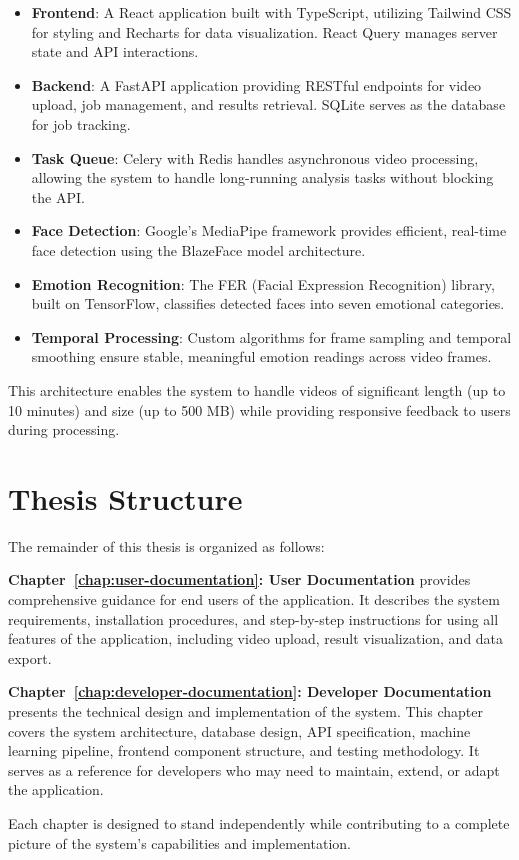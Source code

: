 \begin{itemize}
    \item \textbf{Frontend}: A React application built with TypeScript, utilizing Tailwind CSS for styling and Recharts for data visualization. React Query manages server state and API interactions.

    \item \textbf{Backend}: A FastAPI application providing RESTful endpoints for video upload, job management, and results retrieval. SQLite serves as the database for job tracking.

    \item \textbf{Task Queue}: Celery with Redis handles asynchronous video processing, allowing the system to handle long-running analysis tasks without blocking the API.

    \item \textbf{Face Detection}: Google's MediaPipe framework provides efficient, real-time face detection using the BlazeFace model architecture.

    \item \textbf{Emotion Recognition}: The FER (Facial Expression Recognition) library, built on TensorFlow, classifies detected faces into seven emotional categories.

    \item \textbf{Temporal Processing}: Custom algorithms for frame sampling and temporal smoothing ensure stable, meaningful emotion readings across video frames.
\end{itemize}

This architecture enables the system to handle videos of significant length (up to 10 minutes) and size (up to 500 MB) while providing responsive feedback to users during processing.

\section{Thesis Structure}
\label{sec:structure}

The remainder of this thesis is organized as follows:

\textbf{Chapter~\ref{chap:user-documentation}: User Documentation} provides comprehensive guidance for end users of the application. It describes the system requirements, installation procedures, and step-by-step instructions for using all features of the application, including video upload, result visualization, and data export.

\textbf{Chapter~\ref{chap:developer-documentation}: Developer Documentation} presents the technical design and implementation of the system. This chapter covers the system architecture, database design, API specification, machine learning pipeline, frontend component structure, and testing methodology. It serves as a reference for developers who may need to maintain, extend, or adapt the application.

Each chapter is designed to stand independently while contributing to a complete picture of the system's capabilities and implementation.
